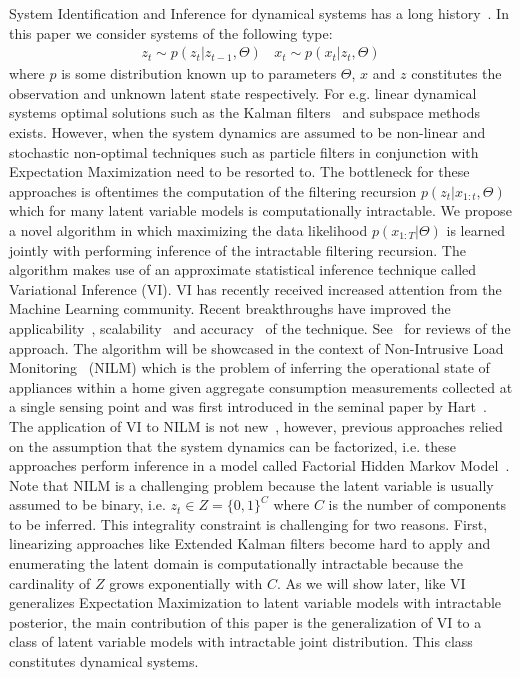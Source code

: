 System Identification and Inference for dynamical systems has a long history~\cite{ljung1998system}. In this paper we consider systems of the following type:
\begin{align*}
z_t \sim p(z_t | z_{t-1}, \Theta) \> \> \> \>x_t \sim p(x_t | z_t, \Theta)
\end{align*}
where $p$ is some distribution known up to parameters $\Theta$, $x$ and $z$ constitutes the observation and unknown latent state respectively. For e.g. linear dynamical systems optimal solutions such as the Kalman filters~\cite{kalman1960contributions} and subspace methods~\cite{van2012subspace} exists. However, when the system dynamics are assumed to be non-linear and stochastic non-optimal techniques such as particle filters in conjunction with Expectation Maximization need to be resorted to. The bottleneck for these approaches is oftentimes the computation of the filtering recursion $p(z_t | x_{1:t},\Theta)$ which for many latent variable models is computationally intractable. 
We propose a novel algorithm in which maximizing the data likelihood $p(x_{1:T}|\Theta)$ is learned jointly with performing inference of the intractable filtering recursion. The algorithm makes use of an approximate statistical inference technique called Variational Inference (VI). VI has recently received increased attention from the Machine Learning community. Recent breakthroughs have improved the applicability~\cite{ranganath2014black}, scalability~\cite{hoffman2013stochastic,kingma2013auto} and accuracy~\cite{rezende2015variational,lange2018factornet} of the technique. See~\cite{zhang2017advances,blei2017variational} for reviews of the approach. 
The algorithm will be showcased in the context of Non-Intrusive Load Monitoring~\cite{hart1992nonintrusive} (NILM) which is the problem of inferring the operational state of appliances within a home given aggregate consumption measurements collected at a single sensing point and was first introduced in the seminal paper by Hart~\cite{hart1992nonintrusive}. The application of VI to NILM is not new~\cite{lange2018varbolt,ng2016scaling}, however, previous approaches relied on the assumption that the system dynamics can be factorized, i.e. these approaches perform inference in a model called Factorial Hidden Markov Model~\cite{ghahramani1996factorial}. Note that NILM is a challenging problem because the latent variable is usually assumed to be binary, i.e. $z_t \in Z = \{0,1\}^C$ where $C$ is the number of components to be inferred. This integrality constraint is challenging for two reasons. First, linearizing approaches like Extended Kalman filters become hard to apply and enumerating the latent domain is computationally intractable because the cardinality of $Z$ grows exponentially with $C$. As we will show later, like VI generalizes Expectation Maximization to latent variable models with intractable posterior, the main contribution of this paper is the generalization of VI to a class of latent variable models with intractable joint distribution. This class constitutes dynamical systems.

